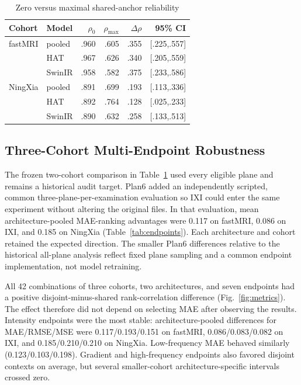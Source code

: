 \documentclass[journal,10pt]{IEEEtran}
\begin{document}
\begin{table}[t]
\caption{Zero versus maximal shared-anchor reliability}
\label{tab:main}\centering
\begin{tabular}{p{1.1cm}p{1.0cm}rrrr}
\toprule
Cohort & Model & $\rho_0$ & $\rho_{\max}$ & $\Delta\rho$ & 95\% CI \\
\midrule
fastMRI & pooled & .960 & .605 & .355 & [.225,.557] \\
 & HAT & .967 & .626 & .340 & [.205,.559] \\
 & SwinIR & .958 & .582 & .375 & [.233,.586] \\
NingXia & pooled & .891 & .699 & .193 & [.113,.336] \\
 & HAT & .892 & .764 & .128 & [.025,.233] \\
 & SwinIR & .890 & .632 & .258 & [.133,.513] \\
\bottomrule
\end{tabular}
\end{table}

\subsection{Three-Cohort Multi-Endpoint Robustness}
The frozen two-cohort comparison in Table~\ref{tab:main} used every eligible plane and remains a historical audit target. Plan6 added an independently scripted, common three-plane-per-examination evaluation so IXI could enter the same experiment without altering the original files. In that evaluation, mean architecture-pooled MAE-ranking advantages were 0.117 on fastMRI, 0.086 on IXI, and 0.185 on NingXia (Table~\ref{tab:endpoints}). Each architecture and cohort retained the expected direction. The smaller Plan6 differences relative to the historical all-plane analysis reflect fixed plane sampling and a common endpoint implementation, not model retraining.

All 42 combinations of three cohorts, two architectures, and seven endpoints had a positive disjoint-minus-shared rank-correlation difference (Fig.~\ref{fig:metrics}). The effect therefore did not depend on selecting MAE after observing the results. Intensity endpoints were the most stable: architecture-pooled differences for MAE/RMSE/MSE were 0.117/0.193/0.151 on fastMRI, 0.086/0.083/0.082 on IXI, and 0.185/0.210/0.210 on NingXia. Low-frequency MAE behaved similarly (0.123/0.103/0.198). Gradient and high-frequency endpoints also favored disjoint contexts on average, but several smaller-cohort architecture-specific intervals crossed zero.
\end{document}

